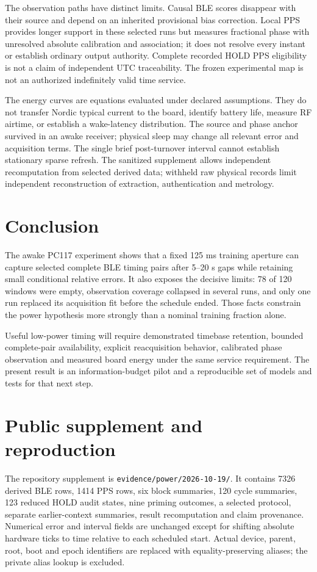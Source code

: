 \documentclass[11pt,letterpaper]{article}
\newcommand{\code}[1]{\texttt{#1}}
\begin{document}
The observation paths have distinct limits. Causal BLE scores disappear with their source and depend on an inherited provisional bias correction. Local PPS provides longer support in these selected runs but measures fractional phase with unresolved absolute calibration and association; it does not resolve every instant or establish ordinary output authority. Complete recorded HOLD PPS eligibility is not a claim of independent UTC traceability. The frozen experimental map is not an authorized indefinitely valid time service.

The energy curves are equations evaluated under declared assumptions. They do not transfer Nordic typical current to the board, identify battery life, measure RF airtime, or establish a wake-latency distribution. The source and phase anchor survived in an awake receiver; physical sleep may change all relevant error and acquisition terms. The single brief post-turnover interval cannot establish stationary sparse refresh. The sanitized supplement allows independent recomputation from selected derived data; withheld raw physical records limit independent reconstruction of extraction, authentication and metrology.

\section{Conclusion}
The awake PC117 experiment shows that a fixed 125 ms training aperture can capture selected complete BLE timing pairs after 5--20 s gaps while retaining small conditional relative errors. It also exposes the decisive limits: 78 of 120 windows were empty, observation coverage collapsed in several runs, and only one run replaced its acquisition fit before the schedule ended. Those facts constrain the power hypothesis more strongly than a nominal training fraction alone.

Useful low-power timing will require demonstrated timebase retention, bounded complete-pair availability, explicit reacquisition behavior, calibrated phase observation and measured board energy under the same service requirement. The present result is an information-budget pilot and a reproducible set of models and tests for that next step.

\appendix
\section{Public supplement and reproduction}\label{app:reproduction}
The repository supplement is \code{evidence/power/2026-10-19/}. It contains 7326 derived BLE rows, 1414 PPS rows, six block summaries, 120 cycle summaries, 123 reduced HOLD audit states, nine priming outcomes, a selected protocol, separate earlier-context summaries, result recomputation and claim provenance. Numerical error and interval fields are unchanged except for shifting absolute hardware ticks to time relative to each scheduled start. Actual device, parent, root, boot and epoch identifiers are replaced with equality-preserving aliases; the private alias lookup is excluded.
\end{document}
